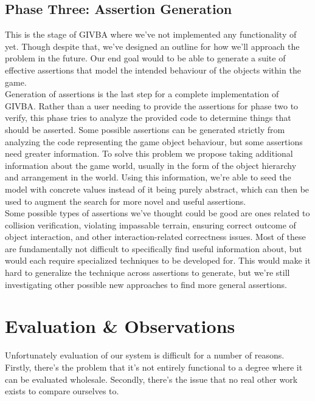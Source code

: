 \documentclass[letterpaper,twocolumn,10pt]{article}
\begin{document}
\subsection{Phase Three: Assertion Generation}

This is the stage of GIVBA where we've not implemented any functionality of yet. Though despite that, we've designed an outline for how we'll approach the problem in the future. Our end goal would to be able to generate a suite of effective assertions that model the intended behaviour of the objects within the game. \\

Generation of assertions is the last step for a complete implementation of GIVBA. Rather than a user needing to provide the assertions for phase two to verify, this phase tries to analyze the provided code to determine things that should be asserted. Some possible assertions can be generated strictly from analyzing the code representing the game object behaviour, but some assertions need greater information. To solve this problem we propose taking additional information about the game world, usually in the form of the object hierarchy and arrangement in the world. Using this information, we're able to seed the model with concrete values instead of it being purely abstract, which can then be used to augment the search for more novel and useful assertions. \\

Some possible types of assertions we've thought could be good are ones related to collision verification, violating impassable terrain, ensuring correct outcome of object interaction, and other interaction-related correctness issues. Most of these are fundamentally not difficult to specifically find useful information about, but would each require specialized techniques to be developed for. This would make it hard to generalize the technique across assertions to generate, but we're still investigating other possible new approaches to find more general assertions. \\

\section{Evaluation \& Observations}

Unfortunately evaluation of our system is difficult for a number of reasons. Firstly, there's the problem that it's not entirely functional to a degree where it can be evaluated wholesale. Secondly, there's the issue that no real other work exists to compare ourselves to. \\
\end{document}
